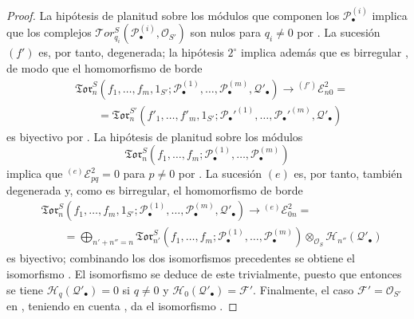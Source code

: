 \begin{proof}
La hipótesis de planitud sobre los módulos que componen los
$\mathscr P_\bullet^{(i)}$ implica que los complejos
$\mathscr{T}\!or_{q_i}^S(\mathscr P_\bullet^{(i)},\mathscr O_{S'})$ son nulos
para $q_i\ne0$ por . La sucesión $(f')$ es, por tanto,
degenerada; la hipótesis $2^\circ$ implica además que es birregular
, de modo que el homomorfismo de borde
\[
\begin{split}
  &\mathfrak{Tor}_n^S
  (f_1,\ldots,f_m,1_{S'};
   \mathscr P_\bullet^{(1)},\ldots,
   \mathscr P_\bullet^{(m)},\mathscr Q'_\bullet)
  \longrightarrow {}^{(f')}\mathscr E_{n0}^2=\\
  &\qquad=
  \mathfrak{Tor}_n^{S'}
  (f'_1,\ldots,f'_m,1_{S'};
   \mathscr P_\bullet'^{(1)},\ldots,
   \mathscr P_\bullet'^{(m)},\mathscr Q'_\bullet)
\end{split}
\tag{6.9.6.4}\label{III.6.9.6.4.fr}
\]
es biyectivo por . La hipótesis de planitud sobre los
módulos
\[
  \mathfrak{Tor}_n^S
  (f_1,\ldots,f_m;
   \mathscr P_\bullet^{(1)},\ldots,\mathscr P_\bullet^{(m)})
\]
implica que ${}^{(e)}\mathscr E_{pq}^2=0$ para $p\ne0$ por
. La sucesión $(e)$ es, por tanto, también degenerada y, como
es birregular, el homomorfismo de borde
\[
\begin{split}
  &\mathfrak{Tor}_n^S
  (f_1,\ldots,f_m,1_{S'};
   \mathscr P_\bullet^{(1)},\ldots,
   \mathscr P_\bullet^{(m)},\mathscr Q'_\bullet)
  \longrightarrow {}^{(e)}\mathscr E_{0n}^2=\\
  &\qquad=
  \bigoplus_{n'+n''=n}
  \mathfrak{Tor}_{n'}^S
  (f_1,\ldots,f_m;
   \mathscr P_\bullet^{(1)},\ldots,
   \mathscr P_\bullet^{(m)})
  \otimes_{\mathscr O_S}\mathscr H_{n''}(\mathscr Q'_\bullet)
\end{split}
\tag{6.9.6.5}\label{III.6.9.6.5.fr}
\]
es biyectivo; combinando los dos isomorfismos precedentes se obtiene el
isomorfismo . El isomorfismo  se deduce
de este trivialmente, puesto que entonces se tiene
$\mathscr H_q(\mathscr Q'_\bullet)=0$ si $q\ne0$ y
$\mathscr H_0(\mathscr Q'_\bullet)=\mathscr F'$. Finalmente, el caso
$\mathscr F'=\mathscr O_{S'}$ en , teniendo en cuenta
, da el isomorfismo .
\end{proof}

